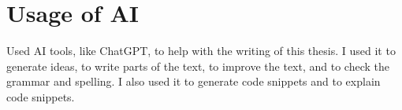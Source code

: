 \chapter{Usage of AI}

Used AI tools, like ChatGPT, to help with the writing of this thesis. I used it to generate ideas, to write parts of the text, to improve the text, and to check the grammar and spelling. I also used it to generate code snippets and to explain code snippets.
